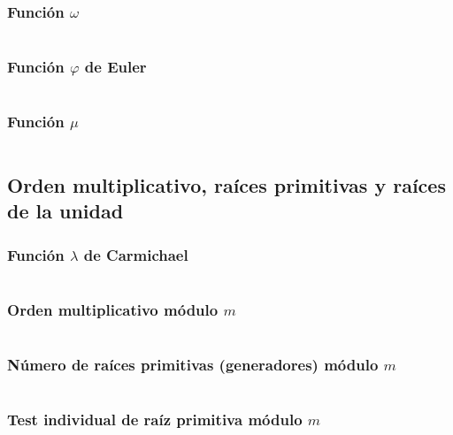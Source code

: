 \documentclass[11pt]{article}
\begin{document}
			\subsubsection{Función $\omega$}
			\inputminted[tabsize=2,breaklines,firstline=237,lastline=244,fontsize=\small]{c++}{numberTheory.cpp}
			
			\subsubsection{Función $\varphi$ de Euler}
			\inputminted[tabsize=2,breaklines,firstline=251,lastline=258,fontsize=\small]{c++}{numberTheory.cpp}
			
			\subsubsection{Función $\mu$}
			\inputminted[tabsize=2,breaklines,firstline=276,lastline=287,fontsize=\small]{c++}{numberTheory.cpp}
			
		\subsection{Orden multiplicativo, raíces primitivas y raíces de la unidad}
			\subsubsection{Función $\lambda$ de Carmichael}
			\inputminted[tabsize=2,breaklines,firstline=260,lastline=274,fontsize=\small]{c++}{numberTheory.cpp}
			
			\subsubsection{Orden multiplicativo módulo $m$}
			\inputminted[tabsize=2,breaklines,firstline=289,lastline=305,fontsize=\small]{c++}{numberTheory.cpp}
			
			\subsubsection{Número de raíces primitivas (generadores) módulo $m$}
			\inputminted[tabsize=2,breaklines,firstline=307,lastline=313,fontsize=\small]{c++}{numberTheory.cpp}
			
			\subsubsection{Test individual de raíz primitiva módulo $m$}
			\inputminted[tabsize=2,breaklines,firstline=315,lastline=325,fontsize=\small]{c++}{numberTheory.cpp}
			
\end{document}
